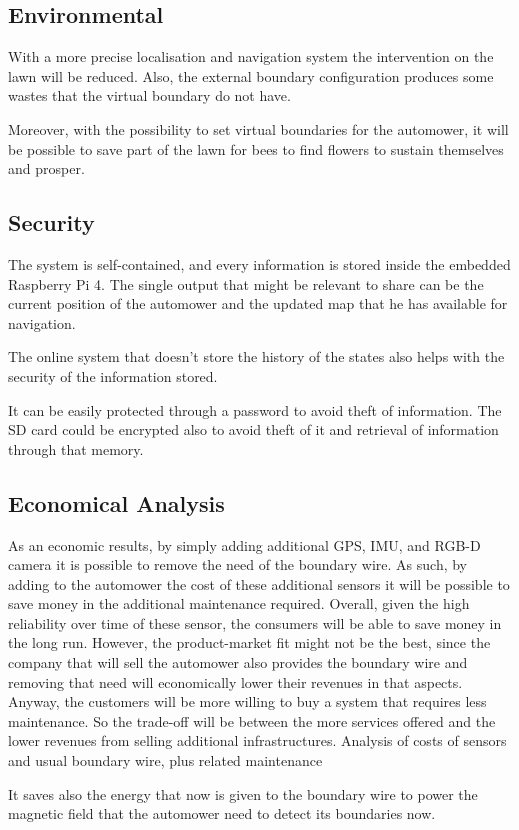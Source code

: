 \subsection{Environmental}
\noindent
With a more precise localisation and navigation system the intervention on the lawn will be reduced.
Also, the external boundary configuration produces some wastes that the virtual boundary do not have.

Moreover, with the possibility to set virtual boundaries for the automower, it will be possible to save part of the lawn for bees to find flowers to sustain themselves and prosper.


\subsection{Security}
\noindent

The system is self-contained, and every information is stored inside the embedded Raspberry Pi 4.
The single output that might be relevant to share can be the current position of the automower and the updated map that he has available for navigation.

The online system that doesn't store the history of the states also helps with the security of the information stored.

It can be easily protected through a password to avoid theft of information.
The SD card could be encrypted also to avoid theft of it and retrieval of information through that memory.

\subsection{Economical Analysis}
\noindent
As an economic results, by simply adding additional GPS, IMU, and RGB-D camera it is possible to remove the need of the boundary wire.
As such, by adding to the automower the cost of these additional sensors it will be possible to save money in the additional maintenance required.
Overall, given the high reliability over time of these sensor, the consumers will be able to save money in the long run.
However, the product-market fit might not be the best, since the company that will sell the automower also provides the boundary wire and removing that need will economically lower their revenues in that aspects. Anyway, the customers will be more willing to buy a system that requires less maintenance.
So the trade-off will be between the more services offered and the lower revenues from selling additional infrastructures.
Analysis of costs of sensors and usual boundary wire, plus related maintenance

It saves also the energy that now is given to the boundary wire to power the magnetic field that the automower need to detect its boundaries now.



\cleardoublepage
